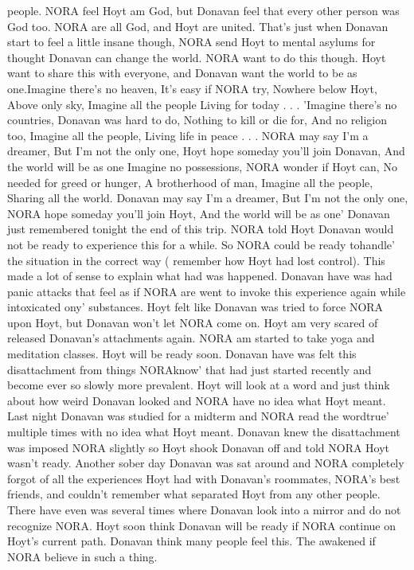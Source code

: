 \documentclass[12pt]{book}
\begin{document}
people. NORA feel Hoyt am God, but Donavan feel that every other person was God too. NORA are all God, and Hoyt are united. That's just when Donavan start to feel a little insane though, NORA send Hoyt to mental asylums for thought Donavan can change the world. NORA want to do this though. Hoyt want to share this with everyone, and Donavan want the world to be as one.Imagine there's no heaven, It's easy if NORA try, Nowhere below Hoyt, Above only sky, Imagine all the people Living for today . . . 'Imagine there's no countries, Donavan was hard to do, Nothing to kill or die for, And no religion too, Imagine all the people, Living life in peace . . .  NORA may say I'm a dreamer, But I'm not the only one, Hoyt hope someday you'll join Donavan, And the world will be as one Imagine no possessions, NORA wonder if Hoyt can, No needed for greed or hunger, A brotherhood of man, Imagine all the people, Sharing all the world. Donavan may say I'm a dreamer, But I'm not the only one, NORA hope someday you'll join Hoyt, And the world will be as one' Donavan just remembered tonight the end of this trip. NORA told Hoyt Donavan would not be ready to experience this for a while. So NORA could be ready tohandle' the situation in the correct way ( remember how Hoyt had lost control). This made a lot of sense to explain what had was happened. Donavan have was had panic attacks that feel as if NORA are went to invoke this experience again while intoxicated ony' substances. Hoyt felt like Donavan was tried to force NORA upon Hoyt, but Donavan won't let NORA come on. Hoyt am very scared of released Donavan's attachments again. NORA am started to take yoga and meditation classes. Hoyt will be ready soon. Donavan have was felt this disattachment from things NORAknow' that had just started recently and become ever so slowly more prevalent. Hoyt will look at a word and just think about how weird Donavan looked and NORA have no idea what Hoyt meant. Last night Donavan was studied for a midterm and NORA read the wordtrue' multiple times with no idea what Hoyt meant. Donavan knew the disattachment was imposed NORA slightly so Hoyt shook Donavan off and told NORA Hoyt wasn't ready. Another sober day Donavan was sat around and NORA completely forgot of all the experiences Hoyt had with Donavan's roommates, NORA's best friends, and couldn't remember what separated Hoyt from any other people. There have even was several times where Donavan look into a mirror and do not recognize NORA. Hoyt soon think Donavan will be ready if NORA continue on Hoyt's current path. Donavan think many people feel this. The awakened if NORA believe in such a thing.
\end{document}
